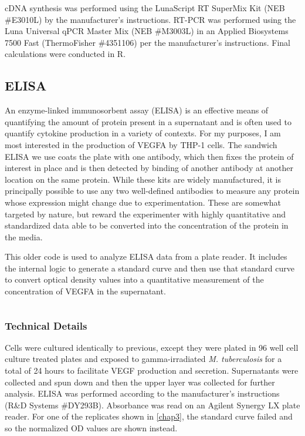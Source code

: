 cDNA synthesis was performed using the LunaScript RT SuperMix Kit (NEB \#E3010L) by the manufacturer's instructions. RT-PCR was performed using the Luna Universal qPCR Master Mix (NEB \#M3003L) in an Applied Biosystems 7500 Fast (ThermoFisher \#4351106) per the manufacturer's instructions. Final calculations were conducted in R. 

\subsection{ELISA}\label{elisa}

An enzyme-linked immunosorbent assay (ELISA) is an effective means of quantifying the amount of protein present in a supernatant and is often used to quantify cytokine production in a variety of contexts. For my purposes, I am most interested in the production of VEGFA by THP-1 cells. The sandwich ELISA we use coats the plate with one antibody, which then fixes the protein of interest in place and is then detected by binding of another antibody at another location on the same protein. While these kits are widely manufactured, it is principally possible to use any two well-defined antibodies to measure any protein whose expression might change due to experimentation. These are somewhat targeted by nature, but reward the experimenter with highly quantitative and standardized data able to be converted into the concentration of the protein in the media.

\begin{code}
\caption{This older code is used to analyze ELISA data from a plate reader. It includes the internal logic to generate a standard curve and then use that standard curve to convert optical density values into a quantitative measurement of the concentration of VEGFA in the supernatant.}
\label{elisaanalysis}

\inputminted[breaklines,frame=single,fontsize=\small]{r}{source/ELISA_Analysis.R}

\end{code}

\subsubsection{Technical Details}\label{howelisa}

Cells were cultured identically to previous, except they were plated in 96 well cell culture treated plates and exposed to gamma-irradiated \textit{M. tuberculosis} for a total of 24 hours to facilitate VEGF production and secretion. Supernatants were collected and spun down and then the upper layer was collected for further analysis. ELISA was performed according to the manufacturer's instructions (R\&D Systems \#DY293B). Absorbance was read on an Agilent Synergy LX plate reader. For one of the replicates shown in \autoref{chap3}, the standard curve failed and so the normalized OD values are shown instead.

